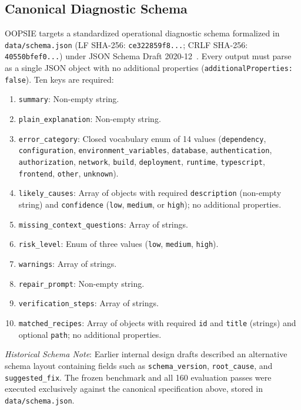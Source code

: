 \documentclass[11pt,a4paper]{article}
\begin{document}
\subsection{Canonical Diagnostic Schema}
\label{sec:canonical-schema}
OOPSIE targets a standardized operational diagnostic schema formalized in\\
\texttt{data/schema.json} (LF SHA-256: \texttt{ce322859f8...}; CRLF SHA-256: \texttt{40550bfef0...}) under JSON Schema Draft 2020-12~\cite{wright2022core,wright2022validation}. Every output must parse as a single JSON object with no additional properties (\texttt{additionalProperties: false}). Ten keys are required:
\begin{enumerate}
    \item \texttt{summary}: Non-empty string.
    \item \texttt{plain\_explanation}: Non-empty string.
    \item \texttt{error\_category}: Closed vocabulary enum of 14 values (\texttt{dependency}, \texttt{configuration}, \texttt{environment\_variables}, \texttt{database}, \texttt{authentication}, \texttt{authorization}, \texttt{network}, \texttt{build}, \texttt{deployment}, \texttt{runtime}, \texttt{typescript}, \texttt{frontend}, \texttt{other}, \texttt{unknown}).
    \item \texttt{likely\_causes}: Array of objects with required \texttt{description} (non-empty string) and \texttt{confidence} (\texttt{low}, \texttt{medium}, or \texttt{high}); no additional properties.
    \item \texttt{missing\_context\_questions}: Array of strings.
    \item \texttt{risk\_level}: Enum of three values (\texttt{low}, \texttt{medium}, \texttt{high}).
    \item \texttt{warnings}: Array of strings.
    \item \texttt{repair\_prompt}: Non-empty string.
    \item \texttt{verification\_steps}: Array of strings.
    \item \texttt{matched\_recipes}: Array of objects with required \texttt{id} and \texttt{title} (strings) and optional \texttt{path}; no additional properties.
\end{enumerate}
\textit{Historical Schema Note}: Earlier internal design drafts described an alternative schema layout containing fields such as \texttt{schema\_version}, \texttt{root\_cause}, and \texttt{suggested\_fix}. The frozen benchmark and all 160 evaluation passes were executed exclusively against the canonical specification above, stored in \texttt{data/schema.json}.
\end{document}
